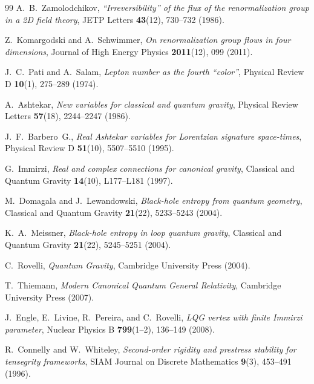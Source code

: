 \documentclass[11pt,a4paper]{article}
\theoremstyle{plain}
\theoremstyle{definition}
\theoremstyle{remark}
\begin{document}
\begin{thebibliography}{99}
A.~B.~Zamolodchikov,
\textit{``Irreversibility'' of the flux of the renormalization group in a 2D field theory},
JETP Letters \textbf{43}(12), 730--732 (1986).

Z.~Komargodski and A.~Schwimmer,
\textit{On renormalization group flows in four dimensions},
Journal of High Energy Physics \textbf{2011}(12), 099 (2011).

J.~C.~Pati and A.~Salam,
\textit{Lepton number as the fourth ``color''},
Physical Review D \textbf{10}(1), 275--289 (1974).

A.~Ashtekar,
\textit{New variables for classical and quantum gravity},
Physical Review Letters \textbf{57}(18), 2244--2247 (1986).

J.~F.~Barbero~G.,
\textit{Real Ashtekar variables for Lorentzian signature space-times},
Physical Review D \textbf{51}(10), 5507--5510 (1995).

G.~Immirzi,
\textit{Real and complex connections for canonical gravity},
Classical and Quantum Gravity \textbf{14}(10), L177--L181 (1997).

M.~Domagala and J.~Lewandowski,
\textit{Black-hole entropy from quantum geometry},
Classical and Quantum Gravity \textbf{21}(22), 5233--5243 (2004).

K.~A.~Meissner,
\textit{Black-hole entropy in loop quantum gravity},
Classical and Quantum Gravity \textbf{21}(22), 5245--5251 (2004).

C.~Rovelli,
\textit{Quantum Gravity},
Cambridge University Press (2004).

T.~Thiemann,
\textit{Modern Canonical Quantum General Relativity},
Cambridge University Press (2007).

J.~Engle, E.~Livine, R.~Pereira, and C.~Rovelli,
\textit{LQG vertex with finite Immirzi parameter},
Nuclear Physics B \textbf{799}(1--2), 136--149 (2008).

R.~Connelly and W.~Whiteley,
\textit{Second-order rigidity and prestress stability for tensegrity frameworks},
SIAM Journal on Discrete Mathematics \textbf{9}(3), 453--491 (1996).


\end{thebibliography}
\end{document}
